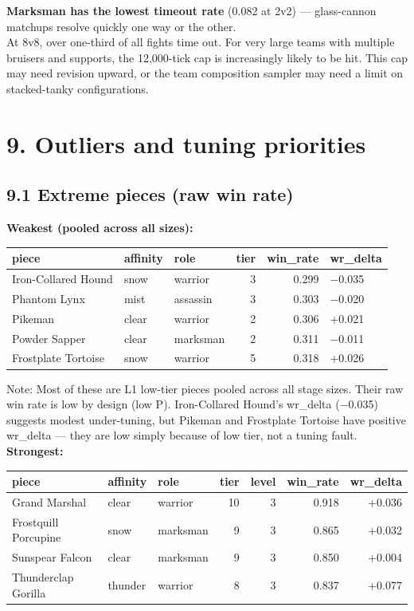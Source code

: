 \documentclass[10pt]{article}
\begin{document}
\textbf{Marksman has the lowest timeout rate} (0.082 at 2v2) --- glass-cannon matchups resolve quickly one way or the other.\\

At 8v8, over one-third of all fights time out. For very large teams with multiple bruisers and supports, the 12,000-tick cap is increasingly likely to be hit. This cap may need revision upward, or the team composition sampler may need a limit on stacked-tanky configurations.\\


\section*{9. Outliers and tuning priorities}

\subsection*{9.1 Extreme pieces (raw win rate)}

\textbf{Weakest (pooled across all sizes):}\\

\medskip
\begin{tabularx}{\linewidth}{LLLrrL}
\toprule
\textbf{piece} & \textbf{affinity} & \textbf{role} & \textbf{tier} & \textbf{win\_rate} & \textbf{wr\_delta} \\
\midrule
Iron-Collared Hound & snow & warrior & 3 & 0.299 & −0.035 \\
Phantom Lynx & mist & assassin & 3 & 0.303 & −0.020 \\
Pikeman & clear & warrior & 2 & 0.306 & +0.021 \\
Powder Sapper & clear & marksman & 2 & 0.311 & −0.011 \\
Frostplate Tortoise & snow & warrior & 5 & 0.318 & +0.026 \\
\bottomrule
\end{tabularx}
\medskip

Note: Most of these are L1 low-tier pieces pooled across all stage sizes. Their raw win rate is low by design (low P). Iron-Collared Hound's wr\_delta (−0.035) suggests modest under-tuning, but Pikeman and Frostplate Tortoise have positive wr\_delta --- they are low simply because of low tier, not a tuning fault.\\

\textbf{Strongest:}\\

\medskip
\begin{tabularx}{\linewidth}{LLLrrrr}
\toprule
\textbf{piece} & \textbf{affinity} & \textbf{role} & \textbf{tier} & \textbf{level} & \textbf{win\_rate} & \textbf{wr\_delta} \\
\midrule
Grand Marshal & clear & warrior & 10 & 3 & 0.918 & +0.036 \\
Frostquill Porcupine & snow & marksman & 9 & 3 & 0.865 & +0.032 \\
Sunspear Falcon & clear & marksman & 9 & 3 & 0.850 & +0.004 \\
Thunderclap Gorilla & thunder & warrior & 8 & 3 & 0.837 & +0.077 \\
\bottomrule
\end{tabularx}
\medskip
\end{document}
